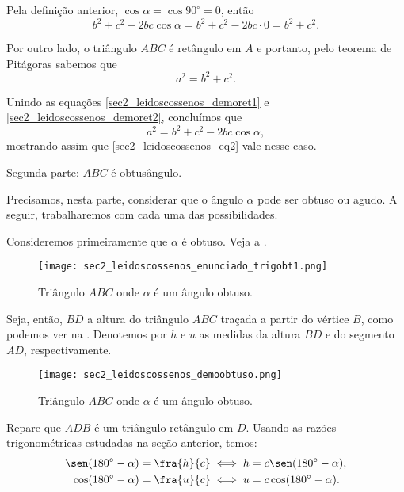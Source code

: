 Pela definição anterior, $\cos \alpha = \cos 90^\circ=0$, então 
\begin{equation}\label{sec2_leidoscossenos_demoret1}
b^2+c^2-2bc\cos\alpha= b^2+c^2-2bc \cdot 0 = b^2+c^2.
\end{equation}

Por outro lado, o triângulo $ABC$ é retângulo em $A$ e portanto, pelo teorema de Pitágoras sabemos que
\begin{equation}\label{sec2_leidoscossenos_demoret2}
a^2=b^2+c^2.
\end{equation}

\no Unindo as equações \eqref{sec2_leidoscossenos_demoret1} e \eqref{sec2_leidoscossenos_demoret2}, concluímos que
$$a^2=b^2+c^2-2bc\cos\alpha,$$
mostrando assim que \eqref{sec2_leidoscossenos_eq2} vale nesse caso.

\vspace{0.5cm}

Segunda parte: $ABC$ é obtusângulo.

Precisamos, nesta parte, considerar que o ângulo $\alpha$ pode ser obtuso ou agudo. A seguir, trabalharemos com cada uma das possibilidades.

Consideremos primeiramente que $\alpha$ é obtuso. Veja a .

\begin{figure}[H]
    \centering
    \texttt{[image: sec2\_leidoscossenos\_enunciado\_trigobt1.png]}
    \caption{Triângulo $ABC$ onde $\alpha$ é um ângulo obtuso.}
    \label{sec2_leidoscossenos_fig_demo_obtusangulo_obtuso1}
\end{figure}

Seja, então, $BD$ a altura do triângulo $ABC$ traçada a partir do vértice $B$, como podemos ver na . Denotemos por $h$ e $u$ as medidas da altura $BD$ e do segmento $AD$, respectivamente.

\begin{figure}[H]
    \centering
    \texttt{[image: sec2\_leidoscossenos\_demoobtuso.png]}
    \caption{Triângulo $ABC$ onde $\alpha$ é um ângulo obtuso.}
    \label{sec2_leidoscossenos_fig_demo_obtusangulo_obtuso2}
\end{figure}

Repare que $ADB$ é um triângulo retângulo em $D$. Usando as razões trigonométricas estudadas na seção anterior, temos:
\begin{eqnarray}{}
 \sen (180^\circ-\alpha) = \fra{h}{c} & \iff h=c\sen (180^\circ-\alpha), \label{sec2_leidoscossenos_demo8}\\ 
 \cos (180^\circ-\alpha) = \fra{u}{c} & \iff u=c\cos (180^\circ-\alpha). \label{sec2_leidoscossenos_demo9}
\end{eqnarray}

